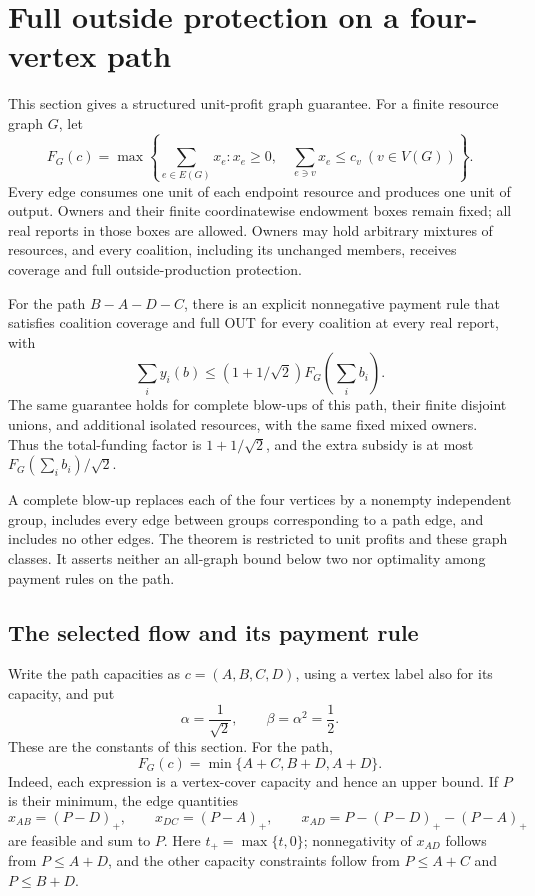 \section{Full outside protection on a four-vertex path}
\label{graph:section}

This section gives a structured unit-profit graph guarantee. For a finite
resource graph $G$, let
\begin{equation}\label{graph:production}
 F_G(c)=\max\left\{\sum_{e\in E(G)}x_e:
 x_e\ge0,\quad\sum_{e\ni v}x_e\le c_v\ (v\in V(G))\right\}.
\end{equation}
Every edge consumes one unit of each endpoint resource and produces one
unit of output. Owners and their finite coordinatewise endowment boxes
remain fixed; all real reports in those boxes are allowed. Owners may
hold arbitrary mixtures of resources, and every coalition, including its
unchanged members, receives coverage and full outside-production protection.

\begin{theorem}\label{graph:theorem}
For the path $B-A-D-C$, there is an explicit nonnegative payment rule that
satisfies coalition coverage and full OUT for every coalition at every
real report, with
\begin{equation}\label{graph:funding-bound}
 \sum_i y_i(b)\le(1+1/\sqrt2)F_G\left(\sum_i b_i\right).
\end{equation}
The same guarantee holds for complete blow-ups of this path, their finite
disjoint unions, and additional isolated resources, with the same fixed
mixed owners. Thus the total-funding factor is $1+1/\sqrt2$, and the
extra subsidy is at most $F_G(\sum_i b_i)/\sqrt2$.
\end{theorem}

A complete blow-up replaces each of the four vertices by a nonempty
independent group, includes every edge between groups corresponding to a
path edge, and includes no other edges. The theorem is restricted to unit
profits and these graph classes. It asserts neither an all-graph bound
below two nor optimality among payment rules on the path.

\subsection{The selected flow and its payment rule}

Write the path capacities as $c=(A,B,C,D)$, using a vertex label also for
its capacity, and put
\[
 \alpha=\frac1{\sqrt2},\qquad \beta=\alpha^2=\frac12.
\]
These are the constants of this section. For the path,
\begin{equation}\label{graph:path-value}
 F_G(c)=\min\{A+C,B+D,A+D\}.
\end{equation}
Indeed, each expression is a vertex-cover capacity and hence an upper
bound. If $P$ is their minimum, the edge quantities
\[
 x_{AB}=(P-D)_+,\qquad x_{DC}=(P-A)_+,\qquad
 x_{AD}=P-(P-D)_+-(P-A)_+
\]
are feasible and sum to $P$. Here $t_+=\max\{t,0\}$;
nonnegativity of $x_{AD}$ follows from $P\le A+D$, and the other capacity
constraints follow from $P\le A+C$ and $P\le B+D$.

